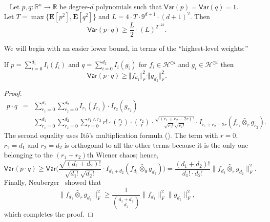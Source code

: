 \documentclass{toc}
\begin{document}
\begin{lemma}~\label{lemma:variance-product-lower}
Let $p, q: \mathbb{R}^n \rightarrow \mathbb{R}$ be degree-$d$ polynomials such that $\mathsf{Var}(p) = \mathsf{Var}(q)=1$. Let $T = \max \{\mathbf{E}[p^2], \mathbf{E}[q^2]\}$ and 
$L=4 \cdot T \cdot 9^{d+1} \cdot (d+1)^2$. 
Then
\[
\mathsf{Var}(p \cdot q) \ge \frac{L}{2} \cdot (L)^{2^{-2d}}. 
\] 
\end{lemma}

We will begin with an easier lower bound, in terms of the ``highest-level weights:''
\begin{lemma}\label{lem:variance-bound}
    If $p = \sum_{i=0}^{d_1} I_i(f_i)$ and $q = \sum_{i=0}^{d_2} I_i(g_i)$
    for $f_i \in \mathcal{H}^{\odot i}$ and $g_i \in \mathcal{H}^{\odot i}$ then
\[
\mathsf{Var}(p \cdot q) \ge {\Vert f_{d_1} \Vert_F^2 \cdot \Vert g_{d_2} \Vert_F^2}.
\] 
\end{lemma}
\begin{proof} 
\begin{eqnarray*}
p \cdot q &=& \sum_{r_1=0}^{d_1} \sum_{r_2=0}^{d_2} I_{r_1}(f_{r_1}) \cdot I_{r_2}(g_{r_2})  \\
&=& \sum_{r_1=0}^{d_1} \sum_{r_2=0}^{d_2} \sum_{r=0}^{r_1 \wedge r_2} r! \cdot \binom{r_1}{r} \cdot \binom{r_2}{r} \cdot \frac{\sqrt{(r_1+r_2 - 2r)!}}{\sqrt{r_1!}\sqrt{r_2!}} \cdot I_{r_1+r_2 - 2r} (f_{r_1} \widetilde{\otimes_r} g_{r_2}). 
\end{eqnarray*}
The second equality uses It\^{o}'s multiplication formula
(). The term with $r=0$, $r_1= d_1$ and
$r_2=d_2$ is orthogonal to all the other terms because it is the only
one belonging to the $(r_1 + r_2)$th Wiener chaos; hence,
\[
\mathsf{Var}(p \cdot q) \ge \mathsf{Var} \bigg( \frac{\sqrt{(d_1+d_2 )!}}{\sqrt{d_1!}\sqrt{d_2!}}  \cdot I_{d_1+d_2} (f_{d_1} \widetilde{\otimes_0} g_{d_2}) \bigg)
= \frac{(d_1 + d_2)!}{d_1! \cdot d_2!} \|f_{d_1} \widetilde{\otimes_r} g_{d_2}\|_F^2.
\]
Finally, Neuberger~\cite{Neuberger:74} showed that
\[
  \|f_{d_1} \widetilde{\otimes_r} g_{d_2}\|_F^2 \ge \frac{1}{\binom{d_1 + d_2}{d_1}} \|f_{d_1}\|_F^2 \|g_{d_2}\|_F^2,
\]
which completes the proof.
\end{proof}
\end{document}
